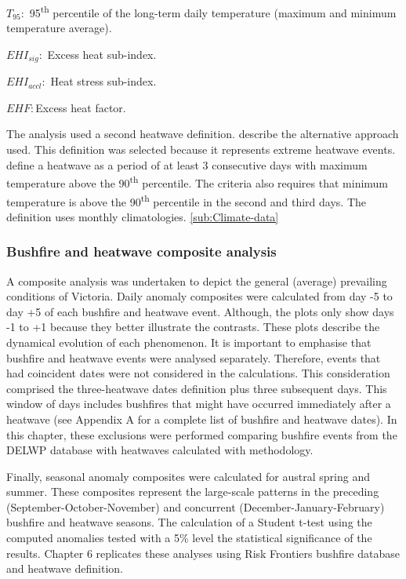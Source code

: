 $T_{95}:$ 95\textsuperscript{th} percentile of the long-term daily
temperature (maximum and minimum temperature average).

$EHI_{sig}:$ Excess heat sub-index.

$EHI_{accl}:$ Heat stress sub-index.

$EHF:$Excess heat factor.

The analysis used a second heatwave definition. \citet{Pezza2012}
describe the alternative approach used. This definition was selected
because it represents extreme heatwave events. \citet{Pezza2012}
define a heatwave as a period of at least 3 consecutive days with
maximum temperature above the 90\textsuperscript{th} percentile.
The criteria also requires that minimum temperature is above the 90\textsuperscript{th}
percentile in the second and third days. The definition uses monthly
climatologies. \ref{sub:Climate-data} 


\subsubsection{Bushfire and heatwave composite analysis}

A composite analysis was undertaken to depict the general (average)
prevailing conditions of Victoria. Daily anomaly composites were calculated
from day -5 to day +5 of each bushfire and heatwave event. Although,
the plots only show days -1 to +1 because they better illustrate the
contrasts. These plots describe the dynamical evolution of each phenomenon.
It is important to emphasise that bushfire and heatwave events were
analysed separately. Therefore, events that had coincident dates were
not considered in the calculations. This consideration comprised the
three-heatwave dates definition plus three subsequent days. This window
of days includes bushfires that might have occurred immediately after
a heatwave (see Appendix A for a complete list of bushfire and heatwave
dates). In this chapter, these exclusions were performed comparing
bushfire events from the DELWP database with heatwaves calculated
with \citet{Nairn2009} methodology. 

Finally, seasonal anomaly composites were calculated for austral spring
and summer. These composites represent the large-scale patterns in
the preceding (September-October-November) and concurrent (December-January-February)
bushfire and heatwave seasons. The calculation of a Student t-test
using the computed anomalies tested with a 5\% level the statistical
significance of the results. Chapter 6 replicates these analyses using
Risk Frontiers bushfire database and \citet{Pezza2012} heatwave definition. 


